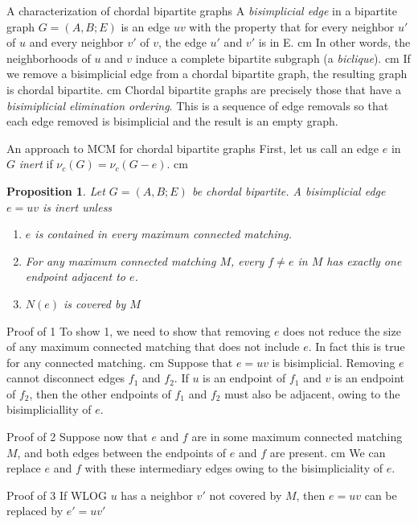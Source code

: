 \documentclass{beamer}
\newtheorem{prop}{Proposition}
\newcommand{\bframe}[2]{\begin{frame}{#1}#2\end{frame}}
\begin{document}
\bframe{A characterization of chordal bipartite graphs}{
A {\it bisimplicial edge} in a bipartite graph $G = (A, B; E)$ is an edge $uv$ with the property that for every neighbor $u'$ of $u$ and every neighbor $v'$ of $v$, the edge $u'$ and $v'$ is in E.\pause\vskip 0.5 cm
In other words, the neighborhoods of $u$ and $v$ induce a complete bipartite subgraph (a {\it biclique}).\pause\vskip 0.5 cm 
If we remove a bisimplicial edge from a chordal bipartite graph, the resulting graph is chordal bipartite.\pause\vskip 0.5 cm
Chordal bipartite graphs are precisely those that have a {\it bisimiplicial elimination ordering}.  This is a sequence of edge removals so that each edge removed is bisimplicial and the result is an empty graph.
}
\bframe{An approach to MCM for chordal bipartite graphs}{
First, let us call an edge $e$ in $G$ {\it inert} if $\nu_c(G) = \nu_c(G-e)$. \pause\vskip 0.5 cm
\begin{prop}
Let $G = (A, B; E)$ be chordal bipartite.  A bisimplicial edge $e = uv$ is inert unless
	\begin{enumerate}
		\item $e$ is contained in every maximum connected matching.
		\item For any maximum connected matching $M$, every $f\neq e $ in $M$ has exactly one endpoint adjacent to $e$.
		\item  $N(e)$ is covered by $M$
	\end{enumerate}
\end{prop}


}

\bframe{Proof of 1}{
To show 1, we need to show that removing $e$ does not reduce the size of any maximum connected matching that does not include $e$.  \pause In fact this is true for any connected matching.\pause\vskip 0.5 cm
Suppose that $e = uv$ is bisimplicial. \pause Removing $e$ cannot disconnect edges $f_1$ and $f_2$.  \pause If $u$ is an endpoint of $f_1$ and $v$ is an endpoint of $f_2$, then the other endpoints of $f_1$ and $f_2$ must also be adjacent, owing to the bisimpliciallity of $e$.
}

\bframe{Proof of 2}{
Suppose now that $e$ and $f$ are in some maximum connected matching $M$, and both edges between the endpoints of $e$ and $f$ are present.  \pause\vskip 0.5 cm
We can replace $e$ and $f$ with these intermediary edges owing to the bisimpliciality of $e$.  
}

\bframe{Proof  of 3}{
If WLOG $u$ has a neighbor $v'$ not covered by $M$, then $e=uv$ can be replaced by $e'=uv'$
}
\end{document}
